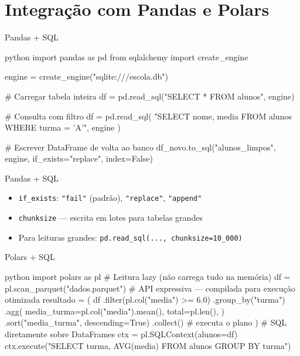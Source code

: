 \documentclass[xcolor=dvipsnames,t,aspectratio=169]{beamer}
\begin{document}
\section{Integração com Pandas e Polars}

\begin{frame}[c, fragile]{Pandas + SQL}

\begin{code}{python}
import pandas as pd
from sqlalchemy import create_engine

engine = create_engine("sqlite:///escola.db")

# Carregar tabela inteira
df = pd.read_sql("SELECT * FROM alunos", engine)

# Consulta com filtro
df = pd.read_sql(
    "SELECT nome, media FROM alunos WHERE turma = 'A'",
    engine
)

# Escrever DataFrame de volta ao banco
df_novo.to_sql("alunos_limpos", engine,
               if_exists="replace", index=False)
\end{code}

\end{frame}
\begin{frame}[c, fragile]{Pandas + SQL}

\begin{itemize}
    \item \texttt{if\_exists}: \texttt{"fail"} (padrão), \texttt{"replace"}, \texttt{"append"}
    \item \texttt{chunksize} — escrita em lotes para tabelas grandes
    \item Para leituras grandes: \texttt{pd.read\_sql(..., chunksize=10\_000)}
\end{itemize}

\end{frame}


\begin{frame}[c, fragile]{Polars + SQL}

\begin{code}{python}
import polars as pl
# Leitura lazy (não carrega tudo na memória)
df = pl.scan_parquet("dados.parquet")
# API expressiva — compilada para execução otimizada
resultado = (
    df
    .filter(pl.col("media") >= 6.0)
    .group_by("turma")
    .agg(
        media_turma=pl.col("media").mean(),
        total=pl.len(),
    )
    .sort("media_turma", descending=True)
    .collect()  # executa o plano
)
# SQL diretamente sobre DataFrames
ctx = pl.SQLContext(alunos=df)
ctx.execute("SELECT turma, AVG(media) FROM alunos GROUP BY turma")
\end{code}

\end{frame}
\end{document}
